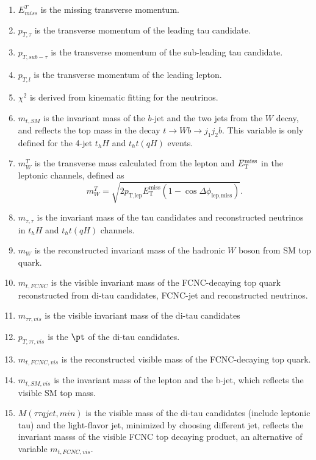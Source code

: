 \begin{enumerate}

\item $E^{T}_{miss}$ is the missing transverse momentum.
\item $p_{T,\tau}$ is the transverse momentum of the leading tau candidate.
\item $p_{T,sub-\tau}$ is the transverse momentum of the sub-leading tau candidate.
\item $p_{T,l}$ is the transverse momentum of the leading lepton.
\item $\chi^2$ is derived from kinematic fitting for the neutrinos.
\item $m_{t,SM}$ is the invariant mass of the $b$-jet and the two jets from the $W$ decay, and reflects the top mass in the decay $t\to Wb \to j_1j_2b$. This variable is only defined for the 4-jet $t_hH$ and $t_ht(qH)$ events.
\item $m^{T}_{W}$ is the transverse mass calculated from the lepton and $E_{\text{T}}^{\text{miss}}$ in the leptonic channels, defined as
\begin{equation}
m^{T}_{W} = \sqrt{2 p_{\text{T,lep}} E_{\text{T}}^{\text{miss}} \left(1-\cos\Delta\phi_{\text{lep,miss}} \right)}.  
\end{equation}
\item $m_{\tau,\tau}$ is the invariant mass of the tau candidates and reconstructed neutrinos in $t_hH$ and $t_ht(qH)$ channels. 
\item $m_{W}$ is the reconstructed invariant mass of the hadronic $W$ boson from SM top quark.
\item $m_{t,FCNC}$ is the visible invariant mass of the FCNC-decaying top quark reconstructed from di-tau candidates, FCNC-jet and reconstructed neutrinos.
\item $m_{\tau\tau,vis}$ is the visible invariant mass of the di-tau candidates
\item $p_{T,\tau\tau,vis}$ is the $\pt$ of the di-tau candidates.
\item $m_{t,FCNC,vis}$ is the reconstructed visible mass of the FCNC-decaying top quark.
\item $m_{t,SM,vis}$ is the invariant mass of the lepton and the b-jet, which reflects the visible SM top mass.
\item $M(\tau\tau qjet,min)$ is the visible mass of the di-tau candidates (include leptonic tau) and the light-flavor jet, minimized by choosing different jet, reflects the invariant masss of the visible FCNC top decaying product, an alternative of variable $m_{t,FCNC,vis}$.

\end{enumerate}
